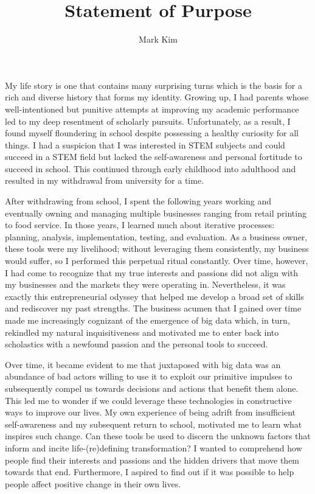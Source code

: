 \documentclass[12pt]{article}
\title{Statement of Purpose}
\author{Mark Kim}
\begin{document}
\maketitle

My life story is one that contains many surprising turns which is the basis for
a rich and diverse history that forms my identity.  Growing up, I had parents
whose well-intentioned but punitive attempts at improving my academic
performance led to my deep resentment of scholarly pursuits.  Unfortunately, as
a result, I found myself floundering in school despite possessing a healthy
curiosity for all things.  I had a suspicion that I was interested in STEM
subjects and could succeed in a STEM field but lacked the self-awareness and
personal fortitude to succeed in school.  This continued through early childhood
into adulthood and resulted in my withdrawal from university for a time.

After withdrawing from school, I spent the following years working and
eventually owning and managing multiple businesses ranging from retail printing
to food service.  In those years, I learned much about iterative processes:
planning, analysis, implementation, testing, and evaluation.  As a business
owner, these tools were my livelihood; without leveraging them
consistently, my business would suffer, so I performed this perpetual ritual constantly.
Over time, however, I had come to recognize that my true interests and
passions did not align with my businesses and the markets they were operating
in. Nevertheless, it was exactly this entrepreneurial odyssey that helped me
develop a broad set of skills and rediscover my past strengths.  The business
acumen that I gained over time made me increasingly cognizant of the emergence
of big data which, in turn, rekindled my natural inquisitiveness and motivated
me to enter back into scholastics with a newfound passion and the personal tools
to succeed.

Over time, it became evident to me that juxtaposed with big data was an
abundance of bad actors willing to use it to exploit our primitive impulses to
subsequently compel us towards decisions and actions that benefit them alone.
This led me to wonder if we could leverage these technologies in constructive
ways to improve our lives. My own experience of being adrift from insufficient
self-awareness and my subsequent return to school, motivated me to learn what
inspires such change. Can these tools be used to discern the unknown factors
that inform and incite life-(re)defining transformation?  I wanted to comprehend
how people find their interests and passions and the hidden drivers that move
them towards that end.  Furthermore, I aspired to find out if it was possible to
help people affect positive change in their own lives.
\end{document}
